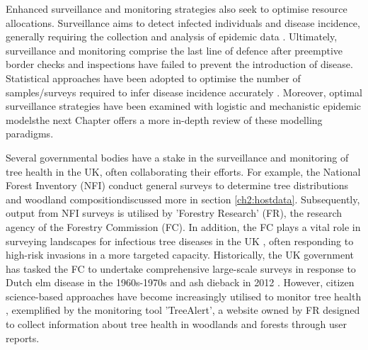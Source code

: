 Enhanced surveillance and monitoring strategies also seek to optimise resource allocations. 
Surveillance aims to detect infected individuals and disease incidence, generally requiring the collection and analysis of epidemic data \cite{surveillance-review}.
Ultimately, surveillance and monitoring comprise the last line of defence after preemptive border checks and inspections have failed to prevent the introduction of disease. 
Statistical approaches have been adopted to optimise the number of samples/surveys required to infer disease incidence accurately \cite{yamamura2016sampling}.
Moreover, optimal surveillance strategies have been examined with logistic \cite{parnell2012estimating} and mechanistic \cite{WEBIDEMICS} epidemic models\textemdash the next Chapter offers a more in-depth review of these modelling paradigms. 

Several governmental bodies have a stake in the surveillance and monitoring of tree health in the UK, often collaborating their efforts. For example, the National Forest Inventory (NFI) conduct general surveys to determine tree distributions and woodland composition\textemdash discussed more in section \ref{ch2:hostdata}. Subsequently, output from NFI surveys is utilised by  'Forestry Research' (FR), the research agency of the Forestry Commission (FC). In addition, the FC plays a vital role in surveying landscapes for infectious tree diseases in the UK \cite{ryle1969forest, james1990history}, often responding to high-risk invasions in a more targeted capacity. Historically, the UK government has tasked the FC to undertake comprehensive large-scale surveys in response to Dutch elm disease in the 1960s-1970s \cite{potter2011learning} and ash dieback in 2012 \cite{tomlinson2016discovery}. 
However, citizen science-based approaches have become increasingly utilised to monitor tree health \cite{brown2020role}, exemplified by the monitoring tool 'TreeAlert', a website owned by FR designed to collect information about tree health in woodlands and forests through user reports.

